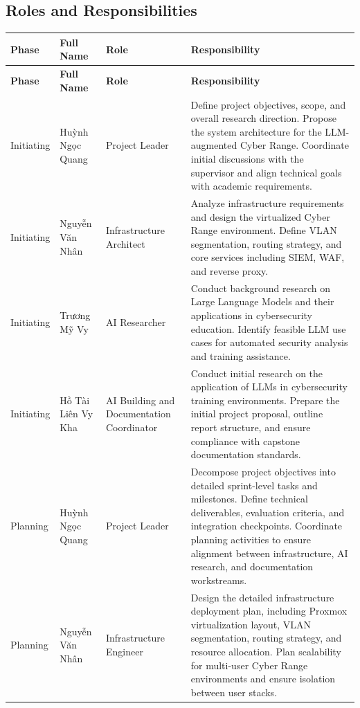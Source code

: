 \subsection{Roles and Responsibilities}
\begingroup
\setlength{\LTleft}{\fill}
\setlength{\LTright}{\fill}
\setlength{\tabcolsep}{3pt}
\renewcommand{\arraystretch}{1.2}
\small
\begin{longtable}{|p{2.5cm}|p{3.0cm}|p{2.8cm}|p{5.2cm}|}
	\hline
	\textbf{Phase} & \textbf{Full Name} & \textbf{Role} & \textbf{Responsibility} \\
	\hline
	\endfirsthead
	\hline
	\textbf{Phase} & \textbf{Full Name} & \textbf{Role} & \textbf{Responsibility} \\
	\hline
	\endhead

	Initiating & Huỳnh Ngọc Quang & Project Leader & Define project objectives, scope, and overall research direction. Propose the system architecture for the LLM-augmented Cyber Range. Coordinate initial discussions with the supervisor and align technical goals with academic requirements. \\
	\hline
	Initiating & Nguyễn Văn Nhân & Infrastructure Architect & Analyze infrastructure requirements and design the virtualized Cyber Range environment. Define VLAN segmentation, routing strategy, and core services including SIEM, WAF, and reverse proxy. \\
	\hline
	Initiating & Trương Mỹ Vy & AI Researcher & Conduct background research on Large Language Models and their applications in cybersecurity education. Identify feasible LLM use cases for automated security analysis and training assistance. \\
	\hline
	Initiating & Hồ Tài Liên Vy Kha & AI Building and Documentation Coordinator & Conduct initial research on the application of LLMs in cybersecurity training environments. Prepare the initial project proposal, outline report structure, and ensure compliance with capstone documentation standards. \\
	\hline
	Planning & Huỳnh Ngọc Quang & Project Leader & Decompose project objectives into detailed sprint-level tasks and milestones. Define technical deliverables, evaluation criteria, and integration checkpoints. Coordinate planning activities to ensure alignment between infrastructure, AI research, and documentation workstreams. \\
	\hline
	Planning & Nguyễn Văn Nhân & Infrastructure Engineer & Design the detailed infrastructure deployment plan, including Proxmox virtualization layout, VLAN segmentation, routing strategy, and resource allocation. Plan scalability for multi-user Cyber Range environments and ensure isolation between user stacks. \\

\end{longtable}
